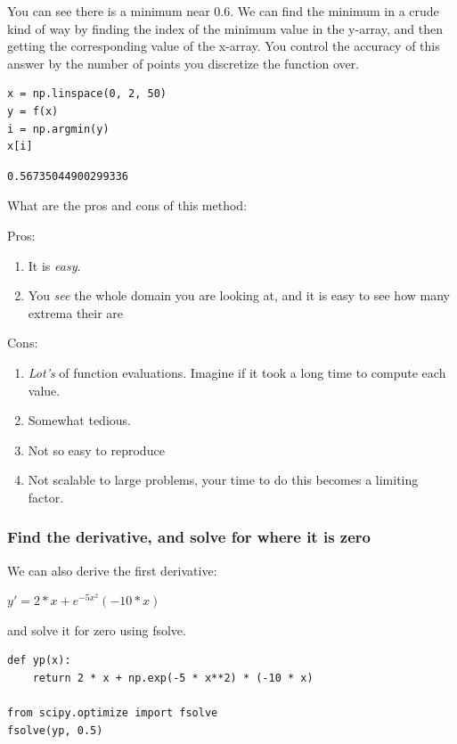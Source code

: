 \documentclass[11pt]{article}
\begin{document}
You can see there is a minimum near 0.6. We can find the minimum in a crude kind of way by finding the index of the minimum value in the y-array, and then getting the corresponding value of the x-array. You control the accuracy of this answer by the number of points you discretize the function over.

\begin{verbatim}
x = np.linspace(0, 2, 50)
y = f(x)
i = np.argmin(y)
x[i]
\end{verbatim}

\begin{verbatim}
0.56735044900299336
\end{verbatim}

What are the pros and cons of this method:

Pros:
\begin{enumerate}
\item It is \emph{easy}.
\item You \emph{see} the whole domain you are looking at, and it is easy to see how many extrema their are
\end{enumerate}

Cons:
\begin{enumerate}
\item \emph{Lot's} of function evaluations. Imagine if it took a long time to compute each value.
\item Somewhat tedious.
\item Not so easy to reproduce
\item Not scalable to large problems, your time to do this becomes a limiting factor.
\end{enumerate}

\subsubsection{Find the derivative, and solve for where it is zero}
\label{sec:org0f106f9}

We can also derive the first derivative:

\(y' = 2 * x + e^{-5 x^2} (-10 * x)\)

and solve it for zero using fsolve.

\begin{verbatim}
def yp(x):
    return 2 * x + np.exp(-5 * x**2) * (-10 * x)

from scipy.optimize import fsolve
fsolve(yp, 0.5)
\end{verbatim}
\end{document}

